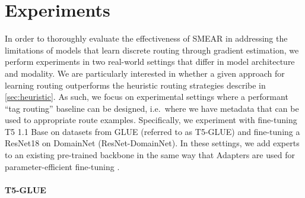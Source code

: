 \documentclass{article}
\theoremstyle{plain}
\theoremstyle{definition}
\theoremstyle{remark}
\begin{document}
\section{Experiments}
\label{sec:setup}
In order to thoroughly evaluate the effectiveness of SMEAR in addressing the limitations of models that learn discrete routing through gradient estimation, we perform experiments in two real-world settings that differ in model architecture and modality.
We are particularly interested in whether a given approach for learning routing outperforms the heuristic routing strategies describe in \cref{sec:heuristic}.
As such, we focus on experimental settings where a performant ``tag routing'' baseline can be designed, i.e.\ where we have metadata that can be used to appropriate route examples.
Specifically, we experiment with fine-tuning T5 1.1 Base \citep{raffel2020exploring} on datasets from GLUE \citep{wang2018glue} (referred to as T5-GLUE) and fine-tuning a ResNet18 \citep{he2016deep} on DomainNet \citep{peng2019moment} (ResNet-DomainNet).
In these settings, we add experts to an existing pre-trained backbone in the same way that Adapters are used for parameter-efficient fine-tuning \cite{houlsby2019parameter}.

\paragraph{T5-GLUE}
\end{document}
